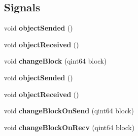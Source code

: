 \subsection*{Signals}
\begin{DoxyCompactItemize}
\item 
\hypertarget{class_k_cloud_1_1_net_object_aaddbaffdc58a8f17bfa8a288c15cac10}{void {\bfseries object\-Sended} ()}\label{class_k_cloud_1_1_net_object_aaddbaffdc58a8f17bfa8a288c15cac10}

\item 
\hypertarget{class_k_cloud_1_1_net_object_a6d044dc4b9a791cd7e84ccd4c8bb1ca3}{void {\bfseries object\-Received} ()}\label{class_k_cloud_1_1_net_object_a6d044dc4b9a791cd7e84ccd4c8bb1ca3}

\item 
\hypertarget{class_k_cloud_1_1_net_object_a50b8a5b3160e005b8d3bf8f0df43cf49}{void {\bfseries change\-Block} (qint64 block)}\label{class_k_cloud_1_1_net_object_a50b8a5b3160e005b8d3bf8f0df43cf49}

\item 
\hypertarget{class_k_cloud_1_1_net_object_aaddbaffdc58a8f17bfa8a288c15cac10}{void {\bfseries object\-Sended} ()}\label{class_k_cloud_1_1_net_object_aaddbaffdc58a8f17bfa8a288c15cac10}

\item 
\hypertarget{class_k_cloud_1_1_net_object_a6d044dc4b9a791cd7e84ccd4c8bb1ca3}{void {\bfseries object\-Received} ()}\label{class_k_cloud_1_1_net_object_a6d044dc4b9a791cd7e84ccd4c8bb1ca3}

\item 
\hypertarget{class_k_cloud_1_1_net_object_ae6ac64e3f272f262a3b218b150f4cc31}{void {\bfseries change\-Block\-On\-Send} (qint64 block)}\label{class_k_cloud_1_1_net_object_ae6ac64e3f272f262a3b218b150f4cc31}

\item 
\hypertarget{class_k_cloud_1_1_net_object_a456b51dbe32a2642a927be7740802c40}{void {\bfseries change\-Block\-On\-Recv} (qint64 block)}\label{class_k_cloud_1_1_net_object_a456b51dbe32a2642a927be7740802c40}

\end{DoxyCompactItemize}
